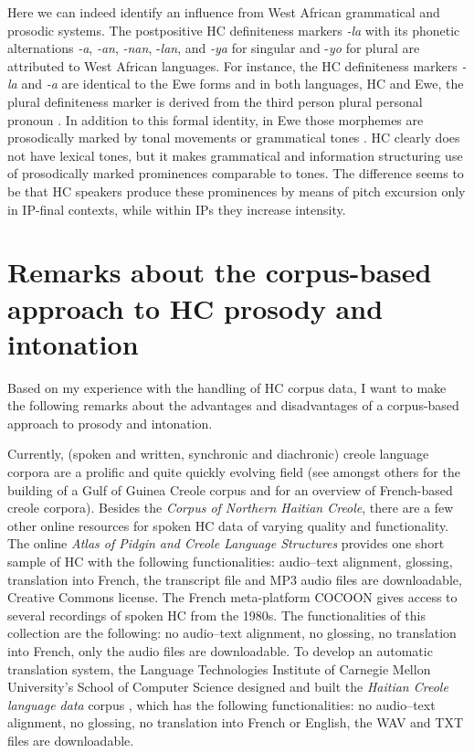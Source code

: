 \documentclass[output=paper]{langsci/langscibook}
\begin{document}
Here we can indeed identify an influence from West African grammatical and prosodic systems. The postpositive HC definiteness markers \textit{-la} with its phonetic alternations \textit{-a}, \textit{-an}, \textit{-nan}, -\textit{lan}, and \textit{-ya} for singular and -\textit{yo} for plural \citep[119-122]{Stein2017} are attributed to West African languages. For instance, the HC definiteness markers \textit{-la} and \textit{-a} are identical to the Ewe forms and in both languages, HC and Ewe, the plural definiteness marker is derived from the third person plural personal pronoun \citep[38]{Sylvain1979}. In addition to this formal identity, in Ewe those morphemes are prosodically marked by tonal movements or grammatical tones \citep[133-202]{Stahlke1971}. HC clearly does not have lexical tones, but it makes grammatical and information structuring use of prosodically marked prominences comparable to tones. The difference seems to be that HC speakers produce these prominences by means of pitch excursion only in IP-final contexts, while within IPs they increase intensity.


\section{\label{sec:kal:5}Remarks about the corpus-based approach to HC prosody and intonation}
Based on my experience with the handling of HC corpus data, I want to make the following remarks about the advantages and disadvantages of a corpus-based approach to prosody and intonation.

Currently, (spoken and written, synchronic and diachronic) creole language corpora are a prolific and quite quickly evolving field (see amongst others \citealt{Hagemeijer2014} for the building of a Gulf of Guinea Creole corpus and \citealt{Kriegel2015} for an overview of French-based creole corpora). Besides the \textit{Corpus of Northern Haitian Creole}, there are a few other online resources for spoken HC data of varying quality and functionality. The online \textit{Atlas of Pidgin and Creole Language Structures} \citep{Michaelis.apics} provides one short sample of HC with the following functionalities: audio–text alignment, glossing, translation into French, the transcript file and MP3 audio files are downloadable, Creative Commons license. The French meta-platform COCOON \citep{LACITO.cocoon} gives access to several recordings of spoken HC from the 1980s. The functionalities of this collection are the following: no audio–text alignment, no glossing, no translation into French, only the audio files are downloadable. To develop an automatic translation system, the Language Technologies Institute of Carnegie Mellon University’s School of Computer Science designed and built the \textit{Haitian Creole language data} corpus \citep{CMUSCS.haitiancreole}, which has the following functionalities: no audio–text alignment, no glossing, no translation into French or English, the WAV and TXT files are downloadable.
\end{document}
